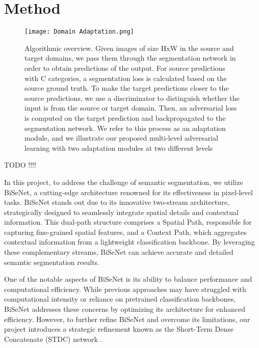 \documentclass[10pt,twocolumn,letterpaper]{article}
\begin{document}
\section{Method}
\label{sec:formatting}

\begin{figure*}[t]
  \centering
   \texttt{[image: Domain Adaptation.png]}
   \caption{
   Algorithmic overview. Given images of size HxW in the source and target domains, we pass them through the segmentation network in order to obtain predictions of the output. For source predictions with C categories, a segmentation loss is calculated based on the source ground truth. To make the target predictions closer to the source predictions, we use a discriminator to distinguish whether the input is from the source or target domain. Then, an adversarial loss is computed on the target prediction and backpropagated to the segmentation network. We refer to
this process as an adaptation module, and we illustrate our proposed multi-level adversarial learning with two adaptation modules at two different levels}
   \label{}
\end{figure*}

TODO !!!!

In this project, to address the challenge of semantic segmentation, we utilize BiSeNet, a cutting-edge architecture renowned for its effectiveness in pixel-level tasks.
BiSeNet \cite{BiS} stands out due to its innovative two-stream architecture, strategically designed to seamlessly integrate spatial details and contextual information. This dual-path structure comprises a Spatial Path, responsible for capturing fine-grained spatial features, and a Context Path, which aggregates contextual information from a lightweight classification backbone. By leveraging these complementary streams, BiSeNet can achieve accurate and detailed semantic segmentation results.

One of the notable aspects of BiSeNet is its ability to balance performance and computational efficiency. While previous approaches may have struggled with computational intensity or reliance on pretrained classification backbones, BiSeNet addresses these concerns by optimizing its architecture for enhanced efficiency. However, to further refine BiSeNet and overcome its limitations, our project introduces a strategic refinement known as the Short-Term Dense Concatenate (STDC) network \cite{RealTimeBiSeNet}.
\end{document}
